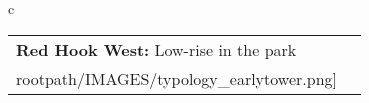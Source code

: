 \begin{table}[H]
        \begin{tabular}{c}
        \begin{tabular}{m{1.5in} m{2in}}
\textbf{Red Hook West:} {Low-rise in the park} & \texttt{[image: \\rootpath/IMAGES/typology\_earlytower.png]}
\end{tabular}\end{tabular}
        \end{table}